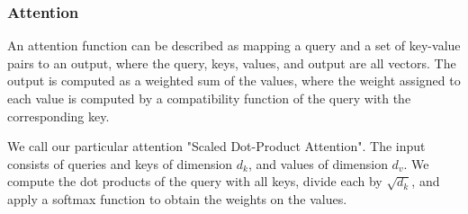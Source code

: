 \documentclass[11pt,a4paper]{article}
\begin{document}
\begin{quoting}
\subsubsection{Attention}\label{attention}

An attention function can be described as mapping a query and a set of
key-value pairs to an output, where the query, keys, values, and output
are all vectors. The output is computed as a weighted sum of the values,
where the weight assigned to each value is computed by a compatibility
function of the query with the corresponding key.

We call our particular attention "Scaled Dot-Product Attention". The
input consists of queries and keys of dimension \(d_k\), and values of
dimension \(d_v\). We compute the dot products of the query with all
keys, divide each by \(\sqrt{d_k}\), and apply a softmax function to
obtain the weights on the values.
     \end{quoting}\noindent
\end{document}

